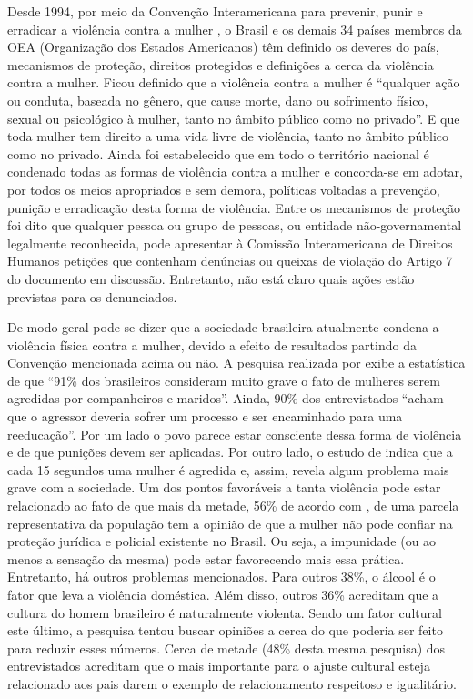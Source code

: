 \documentclass[12pt]{article}
\begin{document}
Desde 1994, por meio da Convenção Interamericana para prevenir, punir e
erradicar a violência
contra a mulher \cite{interamericana}, o Brasil e os demais 34 países membros
da OEA (Organização dos Estados Americanos) têm definido os deveres do
país, mecanismos de proteção, direitos protegidos e definições a cerca da
violência contra a mulher. Ficou definido que a violência contra a mulher
é ``qualquer ação ou conduta, baseada no gênero, que cause morte, dano ou
sofrimento físico, sexual ou psicológico à mulher, tanto no âmbito
público como no privado''. E que toda mulher tem direito a uma vida livre
de violência, tanto no âmbito público como no privado. Ainda foi estabelecido
que em todo o território nacional é condenado todas as formas de
violência contra
a mulher e concorda-se em adotar, por todos os meios apropriados e sem demora,
políticas voltadas a prevenção, punição e erradicação desta forma de violência.
Entre os mecanismos de proteção foi dito que qualquer pessoa ou grupo de
pessoas, ou entidade não-governamental legalmente reconhecida, pode apresentar
à Comissão Interamericana de Direitos Humanos petições que contenham denúncias
ou queixas de violação do Artigo 7 do documento em discussão. Entretanto, não
está claro quais ações estão previstas para os denunciados.

De modo geral pode-se dizer que a sociedade brasileira atualmente condena a
violência física contra a mulher, devido a efeito de resultados partindo
da Convenção mencionada acima ou não. A pesquisa realizada
por \cite{ibope1} exibe a estatística de que ``91\% dos brasileiros
consideram muito grave o fato de mulheres serem agredidas por
companheiros e maridos''. Ainda, 90\% dos entrevistados ``acham que
o agressor deveria sofrer um processo e ser encaminhado para uma
reeducação''. Por um lado o povo parece estar consciente dessa forma
de violência e de que punições devem ser aplicadas. Por outro lado,
o estudo de \cite{avon1} indica que a cada 15 segundos uma mulher é agredida e,
assim, revela algum problema mais grave com a sociedade. Um dos pontos
favoráveis a tanta violência pode estar relacionado ao fato de que mais
da metade, 56\% de acordo com \cite{avon1}, de uma parcela representativa
da população tem a opinião de que a mulher não pode confiar na proteção
jurídica e policial existente no Brasil.
Ou seja, a impunidade (ou ao menos a sensação da mesma) pode estar
favorecendo mais essa prática.
Entretanto, há outros problemas mencionados. Para outros 38\%, o álcool é o
fator que leva a violência doméstica. Além disso, outros 36\% acreditam que a
cultura do homem brasileiro é naturalmente violenta. Sendo um fator cultural
este último, a pesquisa tentou buscar opiniões a cerca do que poderia
ser feito para reduzir esses números. Cerca de metade
(48\% desta mesma pesquisa) dos entrevistados acreditam que o mais
importante para o ajuste cultural esteja relacionado aos pais darem
o exemplo de relacionamento respeitoso e igualitário.
\end{document}
